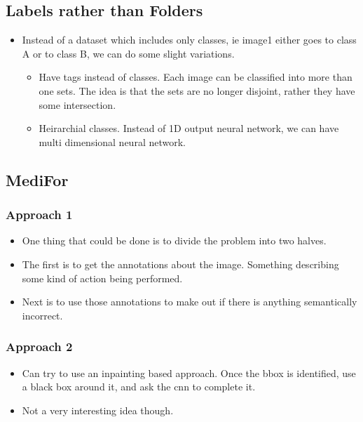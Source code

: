 \documentclass{article}
\begin{document}
\subsection{Labels rather than Folders}
\begin{itemize}
\item Instead of a dataset which includes only classes, ie image1 either goes to class A or to class B, we can do some slight variations.
  \begin{itemize}
  \item Have tags instead of classes. Each image can be classified into more than one sets. The idea is that the sets are no longer disjoint, rather they have some intersection.
  \item Heirarchial classes. Instead of 1D output neural network, we can have multi dimensional neural network.
  \end{itemize}
\end{itemize}

\subsection{MediFor}
\subsubsection{Approach 1}
\begin{itemize}
\item One thing that could be done is to divide the problem into two halves.
\item The first is to get the annotations about the image. Something describing some kind of action being performed.
\item Next is to use those annotations to make out if there is anything semantically incorrect.
\end{itemize}

\subsubsection{Approach 2}
\begin{itemize}
\item Can try to use an inpainting based approach. Once the bbox is identified, use a black box around it, and ask the cnn to complete it.
\item Not a very interesting idea though.
\end{itemize}
\end{document}
